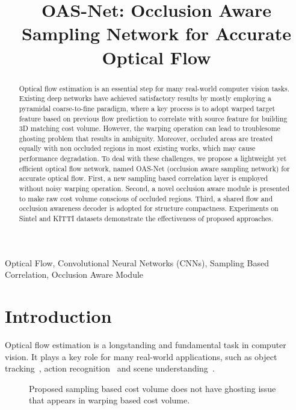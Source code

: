 \documentclass{article}
\title{OAS-Net: Occlusion Aware Sampling Network for Accurate Optical Flow}
\begin{document}
%
\maketitle
%
\begin{abstract}
Optical flow estimation is an essential step for many real-world computer vision tasks. Existing deep networks have achieved satisfactory results by mostly employing a pyramidal coarse-to-fine paradigm, where a key process is to adopt warped target feature based on previous flow prediction to correlate with source feature for building 3D matching cost volume. However, the warping operation can lead to troublesome ghosting problem that results in ambiguity. Moreover, occluded areas are treated equally with non occluded regions in most existing works, which may cause performance degradation. To deal with these challenges, we propose a lightweight yet efficient optical flow network, named OAS-Net (occlusion aware sampling network) for accurate optical flow. First, a new sampling based correlation layer is employed without noisy warping operation. Second, a novel occlusion aware module is presented to make raw cost volume conscious of occluded regions. Third, a shared flow and occlusion awareness decoder is adopted for structure compactness. Experiments on Sintel and KITTI datasets demonstrate the effectiveness of proposed approaches.
\end{abstract}
%
\begin{keywords}
Optical Flow, Convolutional Neural Networks (CNNs), Sampling Based Correlation, Occlusion Aware Module
\end{keywords}
%
\section{Introduction}
\label{sec:intro}
Optical flow estimation is a longstanding and fundamental task in computer vision. It plays a key role for many real-world applications, such as object tracking~\cite{1041198}, action recognition~\cite{NIPS2014_5353} and scene understanding~\cite{Hur_2016}.

\begin{figure}[t]
	\captionsetup[subfigure]{farskip=1pt}
	\centering
	\newline
	\caption{Proposed sampling based cost volume does not have ghosting issue that appears in warping based cost volume.}
	\label{fig1}
	\vspace{-1.0 em}
\end{figure}
\end{document}
